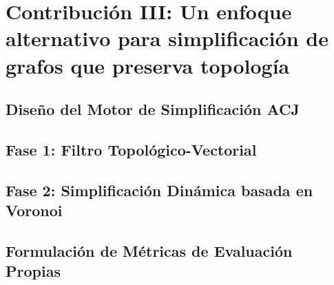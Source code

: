 \chapter{Contribución III: Un enfoque alternativo para simplificación de grafos que preserva topología}

\section{Diseño del Motor de Simplificación ACJ}

\section{Fase 1: Filtro Topológico-Vectorial}

\section{Fase 2: Simplificación Dinámica basada en Voronoi}

\section{Formulación de Métricas de Evaluación Propias}
